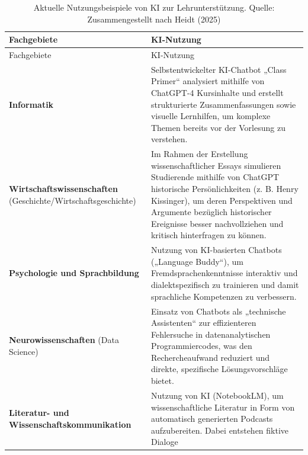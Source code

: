 \documentclass[
  ngerman,
  letterpaper,
  DIV=11]{scrreprt}
\begin{document}
\begin{longtable}[]{@{}
  >{\raggedright\arraybackslash}p{}
  >{\raggedright\arraybackslash}p{}@{}}
\caption{Aktuelle Nutzungsbeispiele von KI zur Lehrunterstützung.
Quelle: Zusammengestellt nach Heidt
(2025)}\label{tbl-nature-examples}\tabularnewline
\toprule\noalign{}
\begin{minipage}[b]{\linewidth}\raggedright
Fachgebiete
\end{minipage} & \begin{minipage}[b]{\linewidth}\raggedright
KI-Nutzung
\end{minipage} \\
\midrule\noalign{}
\endfirsthead
\toprule\noalign{}
\begin{minipage}[b]{\linewidth}\raggedright
Fachgebiete
\end{minipage} & \begin{minipage}[b]{\linewidth}\raggedright
KI-Nutzung
\end{minipage} \\
\midrule\noalign{}
\endhead
\bottomrule\noalign{}
\endlastfoot
\textbf{Informatik} & Selbstentwickelter KI-Chatbot „Class Primer``
analysiert mithilfe von ChatGPT-4 Kursinhalte und erstellt strukturierte
Zusammenfassungen sowie visuelle Lernhilfen, um komplexe Themen bereits
vor der Vorlesung zu verstehen. \\
\textbf{Wirtschaftswissenschaften} (Geschichte/Wirtschaftsgeschichte) &
Im Rahmen der Erstellung wissenschaftlicher Essays simulieren
Studierende mithilfe von ChatGPT historische Persönlichkeiten (z. B.
Henry Kissinger), um deren Perspektiven und Argumente bezüglich
historischer Ereignisse besser nachvollziehen und kritisch hinterfragen
zu können. \\
\textbf{Psychologie und Sprachbildung} & Nutzung von KI-basierten
Chatbots („Language Buddy``), um Fremdsprachenkenntnisse interaktiv und
dialektspezifisch zu trainieren und damit sprachliche Kompetenzen zu
verbessern. \\
\textbf{Neurowissenschaften} (Data Science) & Einsatz von Chatbots als
„technische Assistenten`` zur effizienteren Fehlersuche in
datenanalytischen Programmiercodes, was den Rechercheaufwand reduziert
und direkte, spezifische Lösungsvorschläge bietet. \\
\textbf{Literatur- und Wissenschaftskommunikation} & Nutzung von KI
(NotebookLM), um wissenschaftliche Literatur in Form von automatisch
generierten Podcasts aufzubereiten. Dabei entstehen fiktive Dialoge

\end{longtable}
\end{document}
